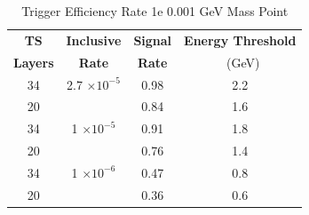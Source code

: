 \begin{table}
 \centering
\caption{Trigger Efficiency Rate 1e 0.001 GeV Mass Point}
\begin{tabular}{ c | c | c | c }
\textbf{TS} & \textbf{Inclusive} & \textbf{Signal} & \textbf{Energy Threshold}  \\ \textbf{Layers} & \textbf{Rate} & \textbf{Rate} & \ (GeV) \\ 
\hline
34 & 2.7 $\times 10^{-5}$ & 0.98 & 2.2 \\ 
20 & & 0.84 & 1.6 \\ 
\hline 
34 & 1 $\times 10^{-5}$ & 0.91 & 1.8 \\ 
20 & & 0.76 & 1.4 \\ 
\hline 
34 & 1 $\times 10^{-6}$ & 0.47 & 0.8 \\ 
20 & & 0.36 & 0.6 \\ 
\hline 
\end{tabular}
\end{table}
